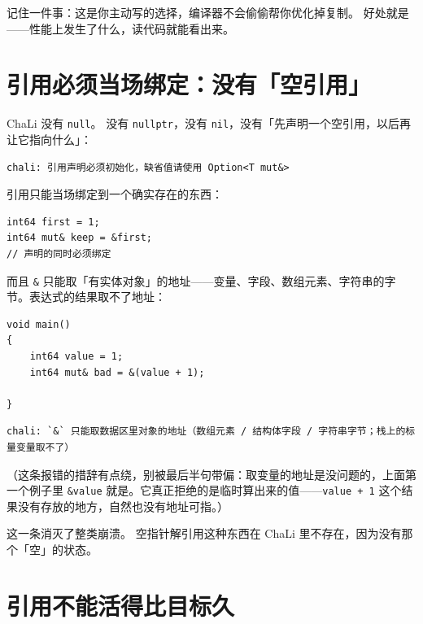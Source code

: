 记住一件事：这是你主动写的选择，编译器不会偷偷帮你优化掉复制。 好处就是——性能上发生了什么，读代码就能看出来。

\section{引用必须当场绑定：没有「空引用」}

ChaLi 没有 \texttt{null}。 没有 \texttt{nullptr}，没有 \texttt{nil}，没有「先声明一个空引用，以后再让它指向什么」：

\par
\medskip
\begin{lstlisting}[style=out]
chali: 引用声明必须初始化，缺省值请使用 Option<T mut&>
\end{lstlisting}
\par
\medskip

引用只能当场绑定到一个确实存在的东西：

\par
\medskip
\begin{lstlisting}[style=chali]
int64 first = 1;
int64 mut& keep = &first;
// 声明的同时必须绑定
\end{lstlisting}
\par
\medskip

而且 \texttt{\&} 只能取「有实体对象」的地址——变量、字段、数组元素、字符串的字节。表达式的结果取不了地址：

\par
\medskip
\begin{lstlisting}[style=chali]
void main()
{
    int64 value = 1;
    int64 mut& bad = &(value + 1);

}
\end{lstlisting}
\par
\medskip

\par
\medskip
\begin{lstlisting}[style=out]
chali: `&` 只能取数据区里对象的地址（数组元素 / 结构体字段 / 字符串字节；栈上的标量变量取不了）
\end{lstlisting}
\par
\medskip

（这条报错的措辞有点绕，别被最后半句带偏：取变量的地址是没问题的，上面第一个例子里 \texttt{\&value} 就是。它真正拒绝的是临时算出来的值——\texttt{value + 1} 这个结果没有存放的地方，自然也没有地址可指。）

这一条消灭了整类崩溃。 空指针解引用这种东西在 ChaLi 里不存在，因为没有那个「空」的状态。

\section{引用不能活得比目标久}

